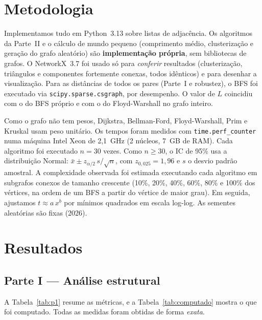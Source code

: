 \documentclass[sigconf]{webmedia}
\begin{document}
\section{Metodologia}
Implementamos tudo em Python~3.13 sobre listas de adjacência. Os algoritmos da
Parte~II e o cálculo de mundo pequeno (comprimento médio, clusterização e geração
do grafo aleatório) são \textbf{implementação própria}, sem bibliotecas de grafos. O
NetworkX~3.7 foi usado só para \emph{conferir} resultados (clusterização,
triângulos e componentes fortemente conexas, todos idênticos) e para desenhar a
visualização. Para as distâncias de todos os pares (Parte~I e robustez), o BFS foi
executado via \texttt{scipy.sparse.csgraph}, por desempenho. O valor de $L$
coincidiu com o do BFS próprio e com o do Floyd-Warshall no grafo inteiro.

Como o grafo não tem pesos, Dijkstra, Bellman-Ford, Floyd-Warshall, Prim e Kruskal
usam peso unitário. Os tempos foram medidos com \texttt{time.perf\_counter} numa
máquina Intel Xeon de 2,1~GHz (2 núcleos, 7~GB de RAM). Cada algoritmo foi
executado $n = 30$ vezes. Como $n \ge 30$, o IC de 95\% usa a distribuição Normal:
$\bar{x} \pm z_{\alpha/2}\, s/\sqrt{n}$, com $z_{0,025}=1{,}96$ e $s$ o desvio
padrão amostral. A complexidade observada foi estimada executando cada algoritmo em
subgrafos conexos de tamanho crescente (10\%, 20\%, 40\%, 60\%, 80\% e 100\% dos
vértices, na ordem de um BFS a partir do vértice de maior grau). Em seguida,
ajustamos $t \approx a\,x^{b}$ por mínimos quadrados em escala log-log. As sementes
aleatórias são fixas (2026).

\section{Resultados}

\subsection{Parte I --- Análise estrutural}
A Tabela~\ref{tab:p1} resume as métricas, e a Tabela~\ref{tab:computado} mostra o
que foi computado. Todas as medidas foram obtidas de forma \emph{exata}.
\end{document}
